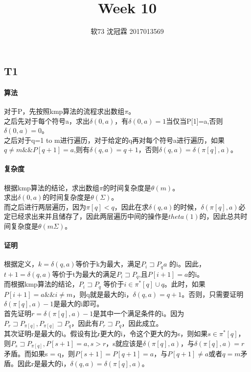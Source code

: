 \documentclass{article}
\title{Week 10}
\author{软73 沈冠霖 2017013569}
\begin{document}
\begin{CJK}{UTF8}{gkai}
\maketitle
\section{T1}

\paragraph{算法}
对于P，先按照kmp算法的流程求出数组$\pi$。\\
之后先对于每个符号a，求出$\delta(0,a)$，有$\delta(0,a) = 1$当仅当P[1]=a,否则$\delta(0,a)=0$。\\
之后对于q=1 to m进行遍历，对于给定的q再对每个符号a进行遍历，如果$q \neq m \&\& P[q+1]=a$,则有$\delta(q,a)=q+1$，否则$\delta(q,a)=\delta(\pi[q],a)$。
\paragraph{复杂度}
根据kmp算法的结论，求出数组$\pi$的时间复杂度是$\theta(m)$。\\
求出$\delta(0,a)$的时间复杂度是$\theta(\Sigma)$。\\
而之后进行两层遍历，因为$\pi[q]<q$，因此在求$\delta(q,a)$的时候，$\delta(\pi[q],a)$必定已经求出来并且储存了，因此两层遍历中间的操作是$theta(1)$的，因此总共时间复杂度是$\theta(m\Sigma)$。
\paragraph{证明}
根据定义，$k=\delta(q,a)$等价于k为最大，满足$P_{i}\sqsupset P_{q}a$ 的i。因此，$t+1=\delta(q,a)$等价于t为最大的满足$P_{i}\sqsupset P_{q}$,且$P[i+1]=a$的i。\\
而根据kmp算法的结论，$P_{i}\sqsupset P_{q}$ 等价于$i \in \pi^{*}[q]\cup{q}$。此时，如果$P[i+1]=a \&\& i \neq m$，则q就是最大的i，$\delta(q,a)=q+1$。否则，只需要证明$\delta(\pi[q],a)-1$是最大的i即可。\\
首先证明$r = \delta(\pi[q],a)-1$是其中一个满足条件的i。因为$P_{r}\sqsupset P_{\pi[q]},P_{\pi[q]}\sqsupset P_{q}$，因此有$P_{r}\sqsupset P_{q}$，因此成立。\\
其次证明r是最大的i。假设有比r更大的i，令这个更大的为s，则如果$s \in \pi^{*}[q]$，则$P_{s}\sqsupset P_{\pi[q]},P[s+1]=a,s>r$，s就应该是$\delta(\pi[q],a)$，与$\delta(\pi[q],a) = r$矛盾。而如果s = q，则$P[s+1]=P[q+1] = a$，与$P[q+1] \neq a$或者$q=m$矛盾。因此r是最大的i，$\delta(q,a) = \delta(\pi[q],a)$。

\end{CJK}
\end{document}
